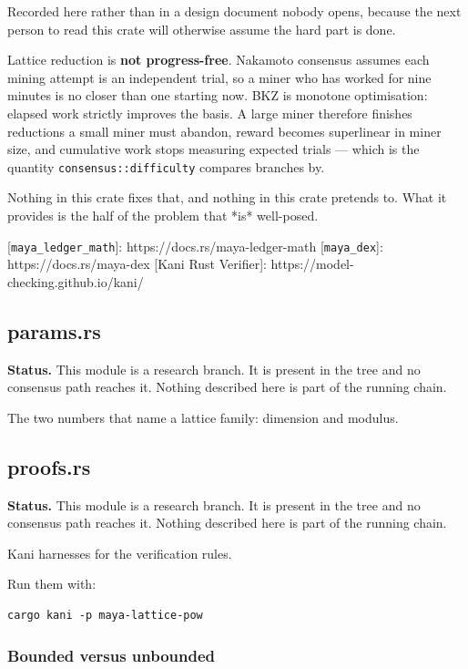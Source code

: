 \documentclass[11pt,a4paper]{article}
\begin{document}
Recorded here rather than in a design document nobody opens, because the
next person to read this crate will otherwise assume the hard part is done.

Lattice reduction is \textbf{not progress-free}. Nakamoto consensus assumes each
mining attempt is an independent trial, so a miner who has worked for nine
minutes is no closer than one starting now. BKZ is monotone optimisation:
elapsed work strictly improves the basis. A large miner therefore finishes
reductions a small miner must abandon, reward becomes superlinear in miner
size, and cumulative work stops measuring expected trials — which is the
quantity \texttt{consensus::difficulty} compares branches by.

Nothing in this crate fixes that, and nothing in this crate pretends to.
What it provides is the half of the problem that *is* well-posed.

[\texttt{maya\_ledger\_math}]: https://docs.rs/maya-ledger-math
[\texttt{maya\_dex}]: https://docs.rs/maya-dex
[Kani Rust Verifier]: https://model-checking.github.io/kani/

\subsection{params.rs}
\begin{framed}\noindent\textbf{Status.} This module is a research branch. It is present in the tree and no consensus path reaches it. Nothing described here is part of the running chain.\end{framed}

The two numbers that name a lattice family: dimension and modulus.

\subsection{proofs.rs}
\begin{framed}\noindent\textbf{Status.} This module is a research branch. It is present in the tree and no consensus path reaches it. Nothing described here is part of the running chain.\end{framed}

Kani harnesses for the verification rules.

Run them with:

\begin{verbatim}
cargo kani -p maya-lattice-pow
\end{verbatim}

\subsubsection{Bounded versus unbounded}
\end{document}

